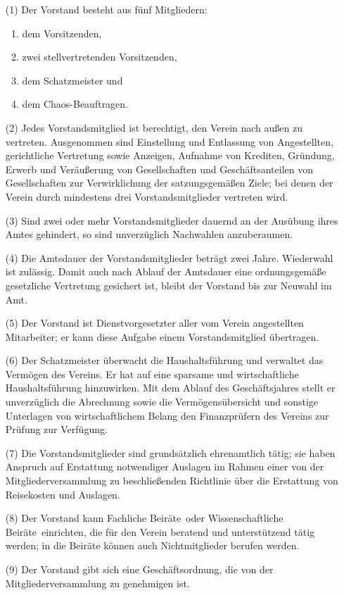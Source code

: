 \documentclass[12pt,paper=a4,ngerman]{scrreprt}
\begin{document}
\begin{itemize}
\item[(1)]
Der Vorstand besteht aus fünf Mitgliedern:
\begin{enumerate}
\item
dem Vorsitzenden,
\item
zwei stellvertretenden Vorsitzenden,
\item
dem Schatzmeister und
\item
dem Chaos-Beauftragen.
\end{enumerate}
\item[(2)]
Jedes Vorstandsmitglied ist berechtigt, den Verein nach außen zu
vertreten. Ausgenommen sind Einstellung und Entlassung von
Angestellten, gerichtliche Vertretung sowie Anzeigen, Aufnahme von
Krediten, Gründung, Erwerb und Veräußerung von Gesellschaften und
Geschäftsanteilen von Gesellschaften zur Verwirklichung der
satzungsgemäßen Ziele; bei denen der Verein durch mindestens drei
Vorstandsmitglieder vertreten wird.
\item[(3)]
Sind zwei oder mehr Vorstandsmitglieder dauernd an der Ausübung ihres
Amtes gehindert, so sind unverzüglich Nachwahlen anzuberaumen.
\item[(4)]
Die Amtsdauer der Vorstandsmitglieder beträgt zwei Jahre. Wiederwahl
ist zulässig. Damit auch nach Ablauf der Amtsdauer eine ordnungsgemäße
gesetzliche Vertretung gesichert ist, bleibt der Vorstand bis zur
Neuwahl im Amt.
\item[(5)]
Der Vorstand ist Dienstvorgesetzter aller vom Verein angestellten
Mitarbeiter; er kann diese Aufgabe einem Vorstandsmitglied
übertragen.
\item[(6)]
Der Schatzmeister überwacht die Haushaltsführung und verwaltet das
Vermögen des Vereins. Er hat auf eine sparsame und wirtschaftliche
Haushaltsführung hinzuwirken. Mit dem Ablauf des Geschäftsjahres
stellt er unverzüglich die Abrechnung sowie die Vermögensübersicht und
sonstige Unterlagen von wirtschaftlichem Belang den Finanzprüfern des
Vereins zur Prüfung zur Verfügung.
\item[(7)]
Die Vorstandsmitglieder sind grundsätzlich ehrenamtlich tätig; sie
haben Anspruch auf Erstattung notwendiger Auslagen im Rahmen einer von
der Mitgliederversammlung zu beschließenden Richtlinie über die
Erstattung von Reisekosten und Auslagen.
\item[(8)]
Der Vorstand kann \glqq Fachliche Beiräte\grqq\ oder \glqq
Wissenschaftliche Beiräte\grqq\ einrichten, die für den Verein
beratend und unterstützend tätig werden; in die Beiräte können auch
Nichtmitglieder berufen werden.
\item[(9)]
Der Vorstand gibt sich eine Geschäftsordnung, die von der
Mitgliederversammlung zu genehmigen ist.
\end{itemize}
\end{document}
